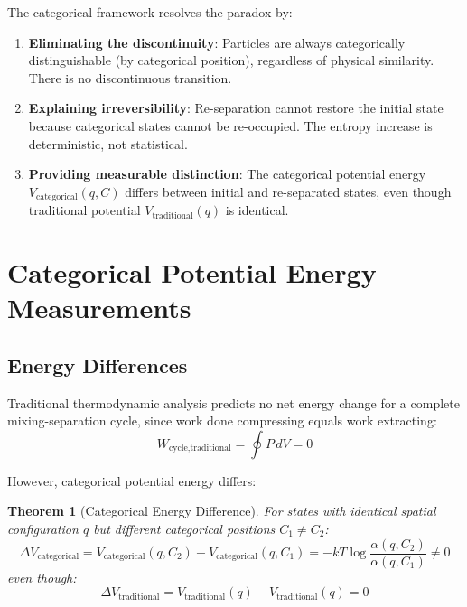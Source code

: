 \documentclass[12pt,a4paper]{article}
\newtheorem{theorem}{Theorem}[section]
\theoremstyle{remark}
\begin{document}
The categorical framework resolves the paradox by:

\begin{enumerate}
\item \textbf{Eliminating the discontinuity}: Particles are always categorically distinguishable (by categorical position), regardless of physical similarity. There is no discontinuous transition.

\item \textbf{Explaining irreversibility}: Re-separation cannot restore the initial state because categorical states cannot be re-occupied. The entropy increase is deterministic, not statistical.

\item \textbf{Providing measurable distinction}: The categorical potential energy $V_\text{categorical}(q, C)$ differs between initial and re-separated states, even though traditional potential $V_\text{traditional}(q)$ is identical.
\end{enumerate}

\section{Categorical Potential Energy Measurements}

\subsection{Energy Differences}

Traditional thermodynamic analysis predicts no net energy change for a complete mixing-separation cycle, since work done compressing equals work extracting:
\begin{equation}
W_\text{cycle,traditional} = \oint P \, dV = 0
\end{equation}

However, categorical potential energy differs:

\begin{theorem}[Categorical Energy Difference]
\label{thm:energy_difference}
For states with identical spatial configuration $q$ but different categorical positions $C_1 \neq C_2$:
\begin{equation}
\Delta V_\text{categorical} = V_\text{categorical}(q, C_2) - V_\text{categorical}(q, C_1) = -kT \log \frac{\alpha(q, C_2)}{\alpha(q, C_1)} \neq 0
\end{equation}
even though:
\begin{equation}
\Delta V_\text{traditional} = V_\text{traditional}(q) - V_\text{traditional}(q) = 0
\end{equation}
\end{theorem}
\end{document}
